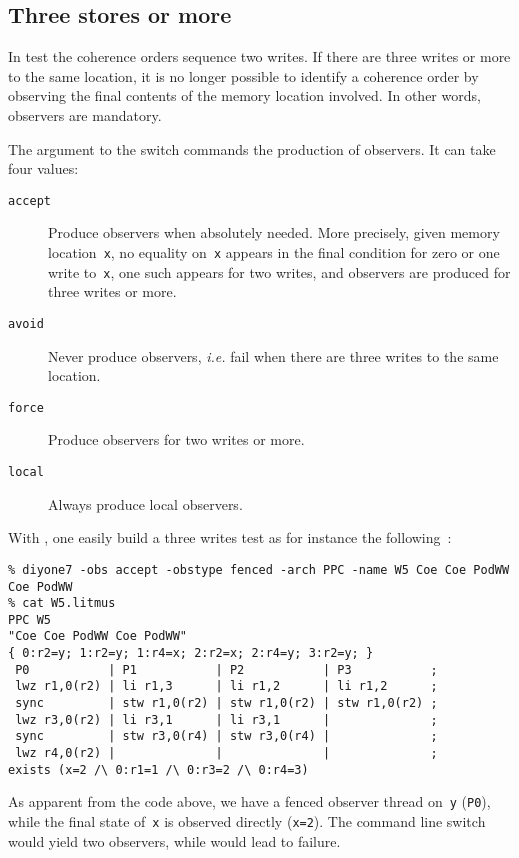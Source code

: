 \subsection{Three \label{sec:obs}stores or more}
In test  the coherence orders sequence two writes.
If there are three writes or more to the same location,
it is no longer possible to
identify a coherence order by observing the final contents of the
memory location involved. In other words, observers are mandatory.

The argument to the  switch commands
the production of observers. It can take four values:
\begin{description}
\item[{\tt accept}] Produce observers when absolutely needed.
More precisely, given memory location~\texttt{x}, no equality
on~\texttt{x} appears
in the final condition for zero or one write to~\texttt{x},
one such appears for two writes, and observers are produced for
three writes or more.
\item[{\tt avoid}] Never produce observers, \emph{i.e.} fail when there
are three writes to the same location.
\item[{\tt force}] Produce observers for two writes or more.
\item[{\tt local}] Always produce local observers.
\end{description}

With \diyone, one easily build a three writes test as for instance
the following~:
\begin{verbatim}
% diyone7 -obs accept -obstype fenced -arch PPC -name W5 Coe Coe PodWW Coe PodWW
% cat W5.litmus
PPC W5
"Coe Coe PodWW Coe PodWW"
{ 0:r2=y; 1:r2=y; 1:r4=x; 2:r2=x; 2:r4=y; 3:r2=y; }
 P0           | P1           | P2           | P3           ;
 lwz r1,0(r2) | li r1,3      | li r1,2      | li r1,2      ;
 sync         | stw r1,0(r2) | stw r1,0(r2) | stw r1,0(r2) ;
 lwz r3,0(r2) | li r3,1      | li r3,1      |              ;
 sync         | stw r3,0(r4) | stw r3,0(r4) |              ;
 lwz r4,0(r2) |              |              |              ;
exists (x=2 /\ 0:r1=1 /\ 0:r3=2 /\ 0:r4=3)
\end{verbatim}
As apparent from the code above, we have a fenced observer thread
on~\texttt{y} (\verb+P0+),
while the final state of~\texttt{x} is observed directly
(\verb+x=2+).
The command line switch  would yield two observers,
while  would lead to failure.

